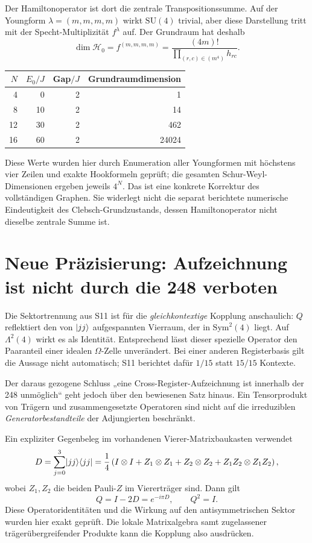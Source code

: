 Der Hamiltonoperator ist dort die zentrale Transpositionssumme. Auf der Youngform $\lambda=(m,m,m,m)$ wirkt $\mathrm{SU}(4)$ trivial, aber diese Darstellung tritt mit der Specht-Multiplizität $f^\lambda$ auf. Der Grundraum hat deshalb
\begin{equation}
\dim\mathcal H_0=f^{(m,m,m,m)}
=\frac{(4m)!}{\prod_{(r,c)\in(m^4)}h_{rc}}.
\end{equation}
\begin{center}
\begin{tabular}{rrrr}
\toprule $N$&$E_0/J$&Gap$/J$&Grundraumdimension\\\midrule
4&0&2&1\\8&10&2&14\\12&30&2&462\\16&60&2&24024\\\bottomrule
\end{tabular}
\end{center}
Diese Werte wurden hier durch Enumeration aller Youngformen mit höchstens vier Zeilen und exakte Hookformeln geprüft; die gesamten Schur-Weyl-Dimensionen ergeben jeweils $4^N$. Das ist eine konkrete Korrektur des vollständigen Graphen. Sie widerlegt nicht die separat berichtete numerische Eindeutigkeit des Clebsch-Grundzustands, dessen Hamiltonoperator nicht dieselbe zentrale Summe ist.

\section{Neue Präzisierung: Aufzeichnung ist nicht durch die 248 verboten}
Die Sektortrennung aus S11 ist für die \emph{gleichkontextige} Kopplung anschaulich: $Q$ reflektiert den von $\lvert jj\rangle$ aufgespannten Vierraum, der in $\mathrm{Sym}^2(4)$ liegt. Auf $\Lambda^2(4)$ wirkt es als Identität. Entsprechend lässt dieser spezielle Operator den Paaranteil einer idealen $\Omega$-Zelle unverändert. Bei einer anderen Registerbasis gilt die Aussage nicht automatisch; S11 berichtet dafür $1/15$ statt $15/15$ Kontexte.

Der daraus gezogene Schluss „eine Cross-Register-Aufzeichnung ist innerhalb der 248 unmöglich“ geht jedoch über den bewiesenen Satz hinaus. Ein Tensorprodukt von Trägern und zusammengesetzte Operatoren sind nicht auf die irreduziblen \emph{Generatorbestandteile} der Adjungierten beschränkt.

Ein expliziter Gegenbeleg im vorhandenen Vierer-Matrixbaukasten verwendet
\begin{equation}
D=\sum_{j=0}^3\lvert jj\rangle\langle jj\rvert
=\frac14\left(I\otimes I+Z_1\otimes Z_1+Z_2\otimes Z_2
+Z_1Z_2\otimes Z_1Z_2\right),
\end{equation}
wobei $Z_1,Z_2$ die beiden Pauli-$Z$ im Viererträger sind. Dann gilt
\begin{equation}
Q=I-2D=e^{-i\pi D},\qquad Q^2=I.
\end{equation}
Diese Operatoridentitäten und die Wirkung auf den antisymmetrischen Sektor wurden hier exakt geprüft. Die lokale Matrixalgebra samt zugelassener trägerübergreifender Produkte kann die Kopplung also ausdrücken.

